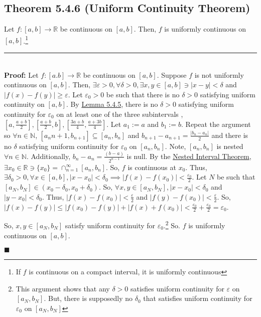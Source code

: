 \documentclass[11pt]{book}
\newcommand{\R}{\mathbb{R}}
\newcommand{\N}{\mathbb{N}}
\newcommand{\horline}{\noindent\rule{14.25cm}{0.6pt}\\}
\newcommand{\QED}{\begin{flushright}$\blacksquare$\end{flushright}}
\begin{document}
		\subsection{Theorem 5.4.6 (Uniform Continuity Theorem)}
		\label{subsec:theor546}
			\begin{theor}
				Let $f:[a,b] \to \R$ be continuous on $[a,b]$. Then, $f$ is uniformly continuous on $[a,b]$.\footnote{If $f$ is continuous on a compact interval, it is uniformly continuous}\hfill\break
				\horline
				\textbf{Proof:} Let $f:[a.b] \to \R$ be continuous on $[a,b]$. Suppose $f$ is not uniformly continuous on $[a,b]$. Then, 
				$\exists \varepsilon > 0, \forall \delta > 0, \exists x,y \in [a,b] \ni |x-y| < \delta$ and $|f(x) - f(y)| \geq \varepsilon$. 
				Let $\varepsilon_0 > 0$ be such that there is no $\delta > 0$ satisfying uniform continuity on $[a,b]$. By \hyperref[subsec:lemm545]{Lemma 5.4.5}, there is no $\delta > 0$ satisfying uniform continuity for $\varepsilon_0$ on at least one of the three subintervals ,$[a,\frac{a+b}{2}], [\frac{a+b}{2}, b],
				[\frac{3a+b}{4}, \frac{a+3b}{4}]$. Let $a_1 := a$ and $b_1:=b$. Repeat the argument so $\forall n \in \N$, $[a_n{n+1}, b_{n+1}] \subseteq
				[a_n,b_n]$ and $b_{n+1} - a_{n+1} = \frac{|b_n - a_n|}{2}$ and there is no $\delta$ satisfying uniform continuity for $\varepsilon_0$
				on $[a_n,b_n]$. Note, $[a_n,b_n]$ is nested $\forall n \in \N$. Additionally, $b_n - a_n = \frac{(b - a)}{2^{n-1}}$ is null. By the
				\hyperref[subsec:theor332]{Nested Interval Theorem}, $\exists x_0 \in \R \ni \{x_0\} = \cap_{n = 1}^{\infty}{[a_n,b_n]}$. So, $f$ is 
				continuous at $x_0$. Thus, $\exists \delta_0 > 0, \forall x \in [a,b], |x-x_0| < \delta_0 \implies |f(x) - f(x_0)| < \frac{\varepsilon_0}{2}$.
				Let $N$ be such that $[a_N,b_N] \in (x_0-\delta_0,x_0+\delta_0)$. So, $\forall x,y \in [a_N,b_N], |x - x_0| < \delta_0$ and 
				$|y-x_0| < \delta_0$. Thus, $|f(x) - f(x_0)| < \frac{\varepsilon}{2}$ and $|f(y) - f(x_0)| < \frac{\varepsilon}{2}$. So, 
				$|f(x) - f(y)| \leq |f(x_0) - f(y)| + |f(x) + f(x_0)| < \frac{\varepsilon_0}{2} + \frac{\varepsilon_0}{2} = \varepsilon_0$.

				So, $x,y \in [a_N,b_N]$ satisfy uniform continuity for $\varepsilon_0$.\footnote{This argument shows that any $\delta>0$ satisfies uniform
				continuity for $\varepsilon$ on $[a_N, b_N]$. But, there is supposedly no $\delta_0$ that satisfies uniform continuity for $\varepsilon_0$
				on $[a_N, b_N]$} So. $f$ is uniformly continuous on $[a,b]$.\QED 
			\end{theor}
\end{document}
